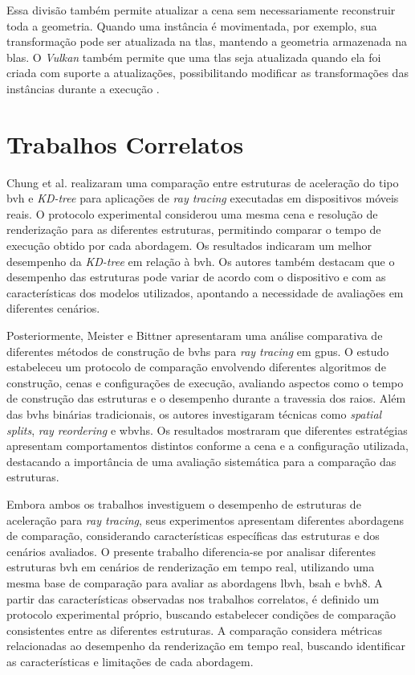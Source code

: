 Essa divisão também permite atualizar a cena sem necessariamente reconstruir toda a geometria. Quando uma instância é movimentada, por exemplo, sua transformação pode ser atualizada na \gls{tlas}, mantendo a geometria armazenada na \gls{blas}. O \textit{Vulkan} também permite que uma \gls{tlas} seja atualizada quando ela foi criada com suporte a atualizações, possibilitando modificar as transformações das instâncias durante a execução \cite{vulkan_tutorial_tlas_animation}.



\section{Trabalhos Correlatos}

Chung et al. \cite{chung2018comparison} realizaram uma comparação entre estruturas de aceleração do tipo \gls{bvh} e \textit{KD-tree} para aplicações de \textit{ray tracing} executadas em dispositivos móveis reais. O protocolo experimental considerou uma mesma cena e resolução de renderização para as diferentes estruturas, permitindo comparar o tempo de execução obtido por cada abordagem. Os resultados indicaram um melhor desempenho da \textit{KD-tree} em relação à \gls{bvh}. Os autores também destacam que o desempenho das estruturas pode variar de acordo com o dispositivo e com as características dos modelos utilizados, apontando a necessidade de avaliações em diferentes cenários.

Posteriormente, Meister e Bittner \cite{meister2022performance} apresentaram uma análise comparativa de diferentes métodos de construção de \glspl{bvh} para \textit{ray tracing} em \glspl{gpu}. O estudo estabeleceu um protocolo de comparação envolvendo diferentes algoritmos de construção, cenas e configurações de execução, avaliando aspectos como o tempo de construção das estruturas e o desempenho durante a travessia dos raios. Além das \glspl{bvh} binárias tradicionais, os autores investigaram técnicas como \textit{spatial splits}, \textit{ray reordering} e \glspl{wbvh}. Os resultados mostraram que diferentes estratégias apresentam comportamentos distintos conforme a cena e a configuração utilizada, destacando a importância de uma avaliação sistemática para a comparação das estruturas.

Embora ambos os trabalhos investiguem o desempenho de estruturas de aceleração para \textit{ray tracing}, seus experimentos apresentam diferentes abordagens de comparação, considerando características específicas das estruturas e dos cenários avaliados. O presente trabalho diferencia-se por analisar diferentes estruturas \gls{bvh} em cenários de renderização em tempo real, utilizando uma mesma base de comparação para avaliar as abordagens \gls{lbvh}, \gls{bsah} e \gls{bvh8}. A partir das características observadas nos trabalhos correlatos, é definido um protocolo experimental próprio, buscando estabelecer condições de comparação consistentes entre as diferentes estruturas. A comparação considera métricas relacionadas ao desempenho da renderização em tempo real, buscando identificar as características e limitações de cada abordagem.
